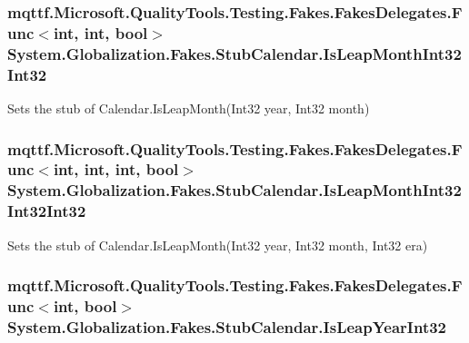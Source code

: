 \hypertarget{class_system_1_1_globalization_1_1_fakes_1_1_stub_calendar_a1466e0d69e232c8450e4012f2db21128}{
\subsubsection[{Is\-Leap\-Month\-Int32\-Int32}]{\setlength{\rightskip}{0pt plus 5cm}mqttf.\-Microsoft.\-Quality\-Tools.\-Testing.\-Fakes.\-Fakes\-Delegates.\-Func$<$int, int, bool$>$ System.\-Globalization.\-Fakes.\-Stub\-Calendar.\-Is\-Leap\-Month\-Int32\-Int32}}\label{class_system_1_1_globalization_1_1_fakes_1_1_stub_calendar_a1466e0d69e232c8450e4012f2db21128}


Sets the stub of Calendar.\-Is\-Leap\-Month(\-Int32 year, Int32 month)

\hypertarget{class_system_1_1_globalization_1_1_fakes_1_1_stub_calendar_a322fe775a2f70fbae39fed73d2c7a0dc}{
\subsubsection[{Is\-Leap\-Month\-Int32\-Int32\-Int32}]{\setlength{\rightskip}{0pt plus 5cm}mqttf.\-Microsoft.\-Quality\-Tools.\-Testing.\-Fakes.\-Fakes\-Delegates.\-Func$<$int, int, int, bool$>$ System.\-Globalization.\-Fakes.\-Stub\-Calendar.\-Is\-Leap\-Month\-Int32\-Int32\-Int32}}\label{class_system_1_1_globalization_1_1_fakes_1_1_stub_calendar_a322fe775a2f70fbae39fed73d2c7a0dc}


Sets the stub of Calendar.\-Is\-Leap\-Month(\-Int32 year, Int32 month, Int32 era)

\hypertarget{class_system_1_1_globalization_1_1_fakes_1_1_stub_calendar_a231e789a556232a3eebb94a0ccdc7a7a}{
\subsubsection[{Is\-Leap\-Year\-Int32}]{\setlength{\rightskip}{0pt plus 5cm}mqttf.\-Microsoft.\-Quality\-Tools.\-Testing.\-Fakes.\-Fakes\-Delegates.\-Func$<$int, bool$>$ System.\-Globalization.\-Fakes.\-Stub\-Calendar.\-Is\-Leap\-Year\-Int32}}\label{class_system_1_1_globalization_1_1_fakes_1_1_stub_calendar_a231e789a556232a3eebb94a0ccdc7a7a}


